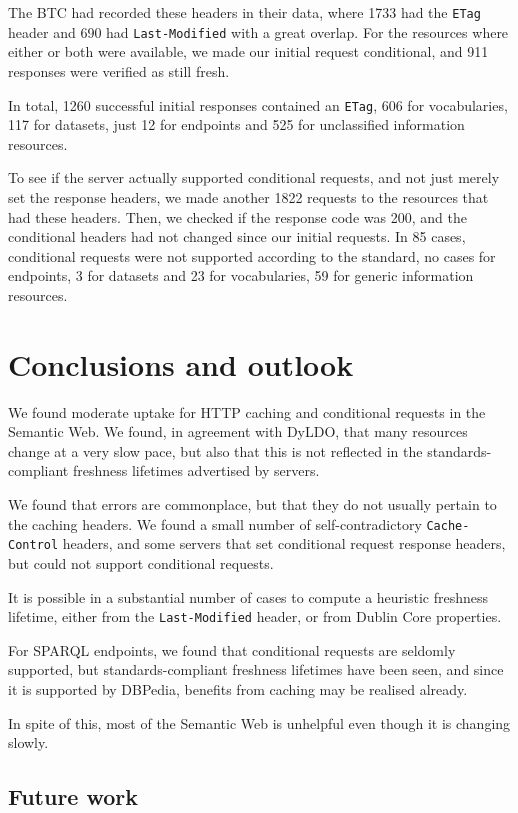 \documentclass{llncs}
\newcommand{\httph}[1]{\texttt{#1}}
\begin{document}
The BTC had recorded these headers in their data, where 1733 had the
\httph{ETag} header and 690 had \httph{Last-Modified} with a great
overlap. For the resources where either or both were available, we
made our initial request conditional, and 911 responses were verified
as still fresh. 

In total, 1260 successful initial responses contained
an \httph{ETag}, 606 for vocabularies, 117 for datasets, just 12 for
endpoints and 525 for unclassified information resources.

To see if the server actually supported conditional requests, and not
just merely set the response headers, we made another 1822 requests to
the resources that had these headers. Then, we checked if the response
code was 200, and the conditional headers had not changed since our
initial requests. In 85 cases, conditional requests were not supported
according to the standard, no cases for endpoints, 3 for datasets and
23 for vocabularies, 59 for generic information resources.

\section{Conclusions and outlook}

We found moderate uptake for HTTP caching and conditional requests in
the Semantic Web. We found, in agreement with DyLDO\cite{dyldo2}, that
many resources change at a very slow pace, but also that this is not
reflected in the standards-compliant freshness lifetimes advertised by
servers.

We found that errors are commonplace, but that they do not usually
pertain to the caching headers. We found a small number of
self-contradictory \httph{Cache-Control} headers, and some servers
that set conditional request response headers, but could not support
conditional requests.

It is possible in a substantial number of cases to compute a heuristic
freshness lifetime, either from the \httph{Last-Modified} header, or
from Dublin Core properties. 

For SPARQL endpoints, we found that conditional requests are 
seldomly supported, but standards-compliant freshness lifetimes have
been seen, and since it is supported by DBPedia, benefits from caching
may be realised already.

In spite of this, most of the Semantic Web is unhelpful even though it
is changing slowly.

\subsection{Future work}
\end{document}
